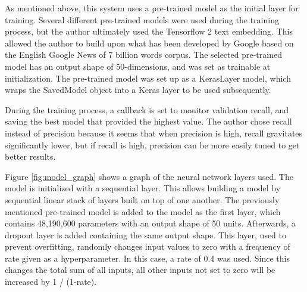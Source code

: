 \documentclass[11pt,a4paper]{article}
\begin{document}
As mentioned above, this system uses a pre-trained model as the initial layer for training. Several different pre-trained models were used during the training process, but the author ultimately used the Tensorflow 2 text embedding. This allowed the author to build upon what has been developed by Google based on the English Google News of 7 billion words corpus. The selected pre-trained model has an output shape of 50-dimensions, and was set as trainable at initialization. The pre-trained model was set up as a KerasLayer model, which wraps the SavedModel object into a Keras layer to be used subsequently. 

During the training process, a callback is set to monitor validation recall, and saving the best model that provided the highest value. The author chose recall instead of precision because it seems that when precision is high, recall gravitates significantly lower, but if recall is high, precision can be more easily tuned to get better results. 

Figure \ref{fig:model_graph} shows a graph of the neural network layers used. The model is initialized with a sequential layer. This allows building a model by sequential linear stack of layers built on top of one another. The previously mentioned pre-trained model is added to the model as the first layer, which contains 48,190,600 parameters with an output shape of 50 units. Afterwards, a dropout layer is added containing the same output shape. This layer, used to prevent overfitting, randomly changes input values to zero with a frequency of rate given as a hyperparameter. In this case, a rate of 0.4 was used. Since this changes the total sum of all inputs, all other inputs not set to zero will be increased by 1 / (1-rate). 
\end{document}
